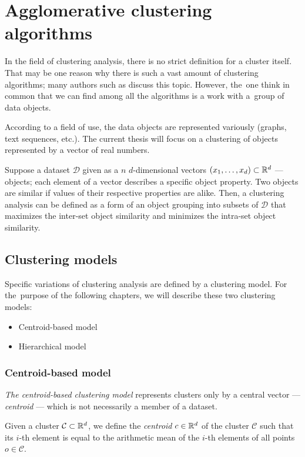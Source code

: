 \chapter{Agglomerative clustering algorithms}

In the field of clustering analysis, there is no strict definition for a cluster itself. That may be one reason why there is such a vast amount of clustering algorithms; many authors such as \citet{estivill2002so} discuss this topic.  However, the~one think in common that we can find among all the algorithms is a work with a~group of data objects.


According to a field of use, the data objects are represented variously (graphs, text sequences, etc.). The current thesis will focus on a clustering of objects represented by a vector of real numbers.

Suppose a dataset $\mathcal{D}$ given as a $n$ $d$-dimensional vectors $(x_1,\dots,x_d) \subset \mathbb{R}^d$  --- objects; each element of a vector describes a specific object property. Two objects are similar if values of their respective properties are alike. Then, a clustering analysis can be defined as a form of an object grouping into subsets of $\mathcal{D}$ that maximizes the inter-set object similarity and minimizes the intra-set object similarity.

\section{Clustering models}

Specific variations of clustering analysis are defined by a clustering model. For the~purpose of the following chapters, we will describe these two clustering models:
\begin{itemize}
	\item Centroid-based model
	\item Hierarchical model
\end{itemize}


\subsection{Centroid-based model}

\emph{The centroid-based clustering model} represents clusters only by a central vector --- \emph{centroid} --- which is not necessarily a member of a dataset.

\begin{defn}[Centroid]
	Given a cluster $\mathcal{C} \subset \mathbb{R}^d$, we define the \emph{centroid} $c \in \mathbb{R}^d$ of the cluster $\mathcal{C}$ such that its $i$-th element is equal to the arithmetic mean of the $i$-th elements of all points $o \in \mathcal{C}$. 
	\label{def01:centr}
\end{defn}

